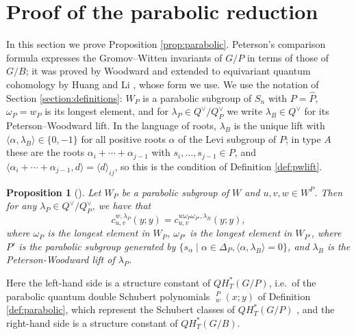 \documentclass{amsart}
\newtheorem{proposition}[lemma]{Proposition}
\theoremstyle{definition}
\theoremstyle{remark}
\numberwithin{equation}{section}
\DeclareMathOperator{\qsch}{\widetilde{\mathfrak{S}}}
\newcommand{\pcomp}[1]{\widehat{#1}}
\begin{document}
\section{Proof of the parabolic reduction} \label{section:pw}

In this section we prove Proposition \ref{prop:parabolic}. Peterson's comparison formula expresses the Gromov--Witten invariants of $G/P$ in terms of those of $G/B$; it was proved by Woodward \cite{woodward2005d} and extended to equivariant quantum cohomology by Huang and Li \cite{huang2015equivariant}, whose form we use. We use the notation of Section \ref{section:definitions}: $W_P$ is a parabolic subgroup of $S_n$ with $P=\pcomp P$, $\omega_P=w_P$ is its longest element, and for $\lambda_P\in Q^\vee/Q^\vee_P$ we write $\lambda_B\in Q^\vee$ for its Peterson--Woodward lift. In the language of roots, $\lambda_B$ is the unique lift with $\langle\alpha,\lambda_B\rangle\in\{0,-1\}$ for all positive roots $\alpha$ of the Levi subgroup of $P$; in type $A$ these are the roots $\alpha_i+\cdots+\alpha_{j-1}$ with $s_i,\ldots,s_{j-1}\in P$, and $\langle\alpha_i+\cdots+\alpha_{j-1},d\rangle=\langle d\rangle_{ij}$, so this is the condition of Definition \ref{def:pwlift}.

\begin{proposition}[{\cite[Proposition~2.10]{huang2015equivariant}}] \label{prop:huangli}
Let $W_P$ be a parabolic subgroup of $W$ and $u,v,w\in W^P$. Then for any $\lambda_P\in Q^\vee/Q_P^\vee$, we have that
$$c_{u,v}^{w,\lambda_P}(y;y) = c_{u,v}^{w\omega_P\omega_{P'},\lambda_B}(y;y),$$
where $\omega_P$ is the longest element in $W_P$, $\omega_{P'}$ is the longest element in $W_{P'}$, where $P'$ is the parabolic subgroup generated by $\{s_\alpha\mid \alpha\in\Delta_P,\langle \alpha, \lambda_B\rangle=0\}$, and $\lambda_B$ is the Peterson-Woodward lift of $\lambda_P$.
\end{proposition}

Here the left-hand side is a structure constant of $QH_T^*(G/P)$, i.e.\ of the parabolic quantum double Schubert polynomials $\qsch^P_w(x;y)$ of Definition \ref{def:parabolic}, which represent the Schubert classes of $QH_T^*(G/P)$ \cite{lam2014quantum}, and the right-hand side is a structure constant of $QH_T^*(G/B)$.
\end{document}
